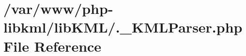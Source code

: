 \hypertarget{_8__KMLParser_8php}{
\section{/var/www/php-\/libkml/libKML/.\_\-KMLParser.php File Reference}
\label{da/d69/_8__KMLParser_8php}
}
